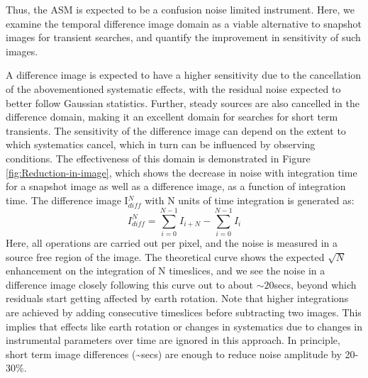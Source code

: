 \documentclass{aa}
\begin{document}
Thus, the ASM is expected to  be a confusion noise limited instrument.  Here, we
examine the temporal difference image domain as a viable alternative to snapshot
images for  transient searches, and  quantify the improvement in  sensitivity of
such images.

A  difference  image  is expected  to  have  a  higher  sensitivity due  to  the
cancellation of  the abovementioned systematic effects, with  the residual noise
expected to better follow Gaussian statistics.  Further, steady sources are also
cancelled in the  difference domain, making it an  excellent domain for searches
for short term  transients.  The sensitivity of the  difference image can depend
on the  extent to which systematics cancel,  which in turn can  be influenced by
observing  conditions.  The  effectiveness  of this  domain  is demonstrated  in
Figure  \ref{fig:Reduction-in-image}, which  shows  the decrease  in noise  with
integration  time for  a snapshot  image as  well as  a difference  image,  as a
function of integration time.  The difference image I$^N_{diff}$ with N units of
time integration is generated as:
\begin{equation}
I^N_{diff} = \sum\limits_{i=0}^{N-1} I_{i+N} - \sum\limits_{i=0}^{N-1} I_i \label{eq:diff_img}
\end{equation}
Here, all operations are  carried out per pixel, and the noise  is measured in a
source  free region  of the  image.  The  theoretical curve  shows  the expected
$\sqrt{N}$ enhancement on the integration of  N timeslices, and we see the noise
in a  difference image closely following  this curve out  to about $\sim20$secs,
beyond  which residuals  start getting  affected by  earth rotation.   Note that
higher  integrations  are  achieved  by  adding  consecutive  timeslices  before
subtracting  two images.   This  implies  that effects  like  earth rotation  or
changes in systematics  due to changes in instrumental  parameters over time are
ignored  in   this  approach.   In  principle,  short   term  image  differences
(\textasciitilde{}secs) are enough to reduce noise amplitude by 20-30\%.
\end{document}
